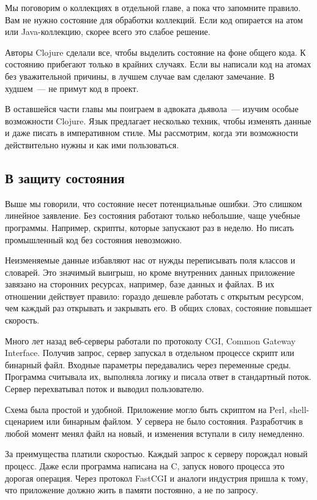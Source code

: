 Мы поговорим о коллекциях в отдельной главе, а пока что запомните правило. Вам
не нужно состояние для обработки коллекций. Если код опирается на атом или
Java-коллекцию, скорее всего это слабое решение.

Авторы Clojure сделали все, чтобы выделить состояние на фоне общего кода. К
состоянию прибегают только в крайних случаях. Если вы написали код на атомах без
уважительной причины, в лучшем случае вам сделают замечание. В худшем~--- не
примут код в проект.

В оставшейся части главы мы поиграем в адвоката дьявола~--- изучим особые
возможности Clojure. Язык предлагает несколько техник, чтобы изменять данные и
даже писать в императивном стиле. Мы рассмотрим, когда эти возможности
действительно нужны и как ими пользоваться.

\subsection{В защиту состояния}

Выше мы говорили, что состояние несет потенциальные ошибки. Это слишком линейное
заявление. Без состояния работают только небольшие, чаще учебные
программы. Например, скрипты, которые запускают раз в неделю. Но писать
промышленный код без состояния невозможно.

Неизменяемые данные избавляют нас от нужды переписывать поля классов и
словарей. Это значимый выигрыш, но кроме внутренних данных приложение завязано
на сторонних ресурсах, например, базе данных и файлах. В их отношении действует
правило: гораздо дешевле работать с открытым ресурсом, чем каждый раз открывать
и закрывать его. В общих словах, состояние повышает скорость.

Много лет назад веб-серверы работали по протоколу CGI, Common Gateway
Interface. Получив запрос, сервер запускал в отдельном процессе скрипт или
бинарный файл. Входные параметры передавались через переменные среды. Программа
считывала их, выполняла логику и писала ответ в стандартный поток. Сервер
перехватывал поток и выводил пользователю.

Схема была простой и удобной. Приложение могло быть скриптом на Perl,
shell-сценарием или бинарным файлом. У сервера не было состояния. Разработчик в
любой момент менял файл на новый, и изменения вступали в силу немедленно.

За преимущества платили скоростью. Каждый запрос к серверу порождал новый
процесс. Даже если программа написана на C, запуск нового процесса это дорогая
операция. Через протокол FastCGI и аналоги индустрия пришла к тому, что
приложение должно жить в памяти постоянно, а не по запросу.

